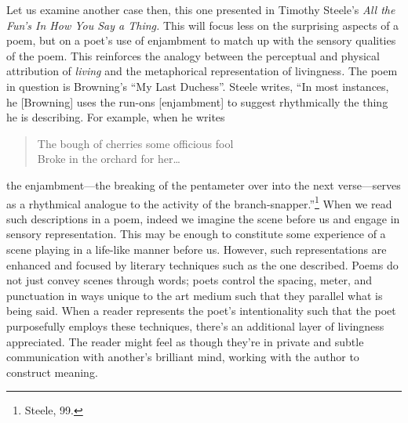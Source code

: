 Let us examine another case then, this one presented in Timothy Steele's
\emph{All the Fun's In How You Say a Thing.} This will focus less on the
surprising aspects of a poem, but on a poet's use of enjambment to match
up with the sensory qualities of the poem. This reinforces the analogy
between the perceptual and physical attribution of \emph{living} and the
metaphorical representation of livingness\emph{.} The poem in question
is Browning's ``My Last Duchess''. Steele writes, ``In most instances,
he {[}Browning{]} uses the run-ons {[}enjambment{]} to suggest
rhythmically the thing he is describing. For example, when he writes

\begin{quote}
The bough of cherries some officious fool\\
Broke in the orchard for her\ldots{}
\end{quote}
the enjambment---the breaking of the pentameter over into the next
verse---serves as a rhythmical analogue to the activity of the
branch-snapper.''\footnote{Steele, 99.} When we read such descriptions
in a poem, indeed we imagine the scene before us and engage in sensory
representation. This may be enough to constitute some experience of a
scene playing in a life-like manner before us. However, such
representations are enhanced and focused by literary techniques such as
the one described. Poems do not just convey scenes through words; poets
control the spacing, meter, and punctuation in ways unique to the art
medium such that they parallel what is being said. When a reader
represents the poet's intentionality such that the poet purposefully
employs these techniques, there's an additional layer of livingness
appreciated. The reader might feel as though they're in private and
subtle communication with another's brilliant mind, working with the
author to construct meaning.

